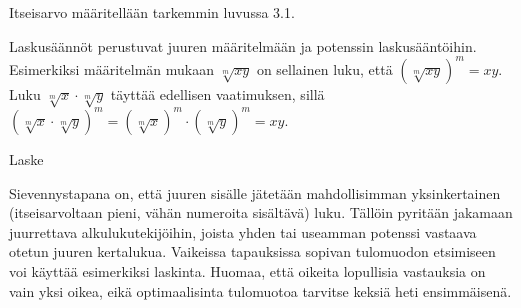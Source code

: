 Itseisarvo määritellään tarkemmin luvussa 3.1. %

Laskusäännöt perustuvat juuren määritelmään ja potenssin laskusääntöihin. Esimerkiksi määritelmän mukaan $\sqrt[m]{xy}$ on sellainen luku, että $\left( \sqrt[m]{xy} \right)^m = xy$. Luku $\sqrt[m]{x} \cdot \sqrt[m]{y}$ täyttää edellisen vaatimuksen, sillä $\left( \sqrt[m]{x} \cdot \sqrt[m]{y} \right)^m = \left( \sqrt[m]{x} \right)^m \cdot \left( \sqrt[m]{y} \right)^m = xy$.

\begin{esimerkki}
Laske

\begin{esimratk}
\end{esimratk}

\begin{esimvast}
\end{esimvast}
\end{esimerkki}

Sievennystapana on, että juuren sisälle jätetään mahdollisimman yksinkertainen (itseisarvoltaan pieni, vähän numeroita sisältävä) luku. Tällöin pyritään jakamaan juurrettava alkulukutekijöihin, joista yhden tai useamman potenssi vastaava otetun juuren kertalukua. Vaikeissa tapauksissa sopivan tulomuodon etsimiseen voi käyttää esimerkiksi laskinta. Huomaa, että oikeita lopullisia vastauksia on vain yksi oikea, eikä optimaalisinta tulomuotoa tarvitse keksiä heti ensimmäisenä.


